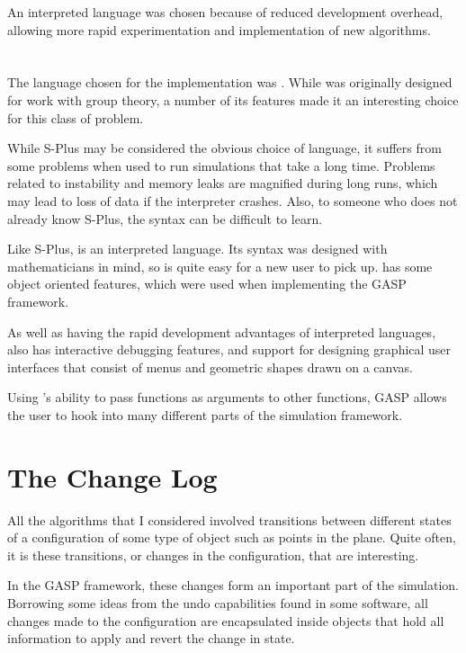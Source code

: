 An interpreted language was chosen because of reduced development
overhead, allowing more rapid experimentation and implementation of
new algorithms.

\section{\GAP}

The language chosen for the implementation was \GAP{} \cite{gap-www}.
While \GAP{} was originally designed for work with group theory, a
number of its features made it an interesting choice for this class of
problem.

While S-Plus \cite{s-plus} may be considered the obvious choice of
language, it suffers from some problems when used to run simulations
that take a long time.  Problems related to instability and memory
leaks are magnified during long runs, which may lead to loss of data
if the interpreter crashes.  Also, to someone who does not already
know S-Plus, the syntax can be difficult to learn.

Like S-Plus, \GAP{} is an interpreted language.  Its syntax was
designed with mathematicians in mind, so is quite easy for a new user
to pick up.  \GAP{} has some object oriented features, which were used
when implementing the GASP framework.

As well as having the rapid development advantages of interpreted
languages, \GAP{} also has interactive debugging features, and support
for designing graphical user interfaces that consist of menus and
geometric shapes drawn on a canvas.

Using \GAP{}'s ability to pass functions as arguments to other
functions, GASP allows the user to hook into many different parts of
the simulation framework.

\section{The Change Log}

All the algorithms that I considered involved transitions between
different states of a configuration of some type of object such as
points in the plane.  Quite often, it is these transitions, or changes
in the configuration, that are interesting.

In the GASP framework, these changes form an important part of the
simulation.  Borrowing some ideas from the undo capabilities found in
some software, all changes made to the configuration are encapsulated
inside objects that hold all information to apply and revert the
change in state.

